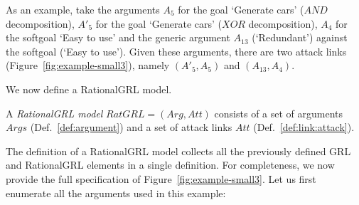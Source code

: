 As an example, take the arguments $A_5$ for the goal `Generate cars' ($AND$ decomposition), $A'_5$ for the goal `Generate cars' ($XOR$ decomposition), $A_4$ for the softgoal `Easy to use' and the generic argument $A_{13}$ (`Redundant') against the softgoal (`Easy to use'). Given these arguments, there are two attack links (Figure~\ref{fig:example-small3}), namely $(A'_{5},A_{5})$ and $(A_{13}, A_{4})$.

We now define a RationalGRL model.

\begin{definition}
\label{def:rationalgrl-model}
A \emph{RationalGRL model} $RatGRL=(Arg, Att)$ consists of a set of arguments $Args$ (Def.~\ref{def:argument}) and a set of attack links $Att$ (Def.~\ref{def:link:attack}).
\end{definition}

The definition of a RationalGRL model collects all the previously defined GRL and RationalGRL elements in a single definition. For completeness, we now provide the full specification of Figure~\ref{fig:example-small3}. Let us first enumerate all the arguments used in this example:

